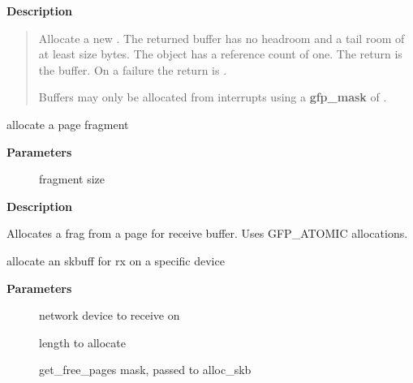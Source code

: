 \documentclass[a4paper,8pt,english]{sphinxmanual}
\begin{document}
\textbf{Description}
\begin{quote}

Allocate a new {\hyperref[networking/kapi:c.sk_buff]{\emph{}}}. The returned buffer has no headroom and a
tail room of at least size bytes. The object has a reference count
of one. The return is the buffer. On a failure the return is .

Buffers may only be allocated from interrupts using a \textbf{gfp\_mask} of
.
\end{quote}

\begin{fulllineitems}
\label{networking/kapi:c.netdev_alloc_frag}
allocate a page fragment

\end{fulllineitems}


\textbf{Parameters}
\begin{description}
\item[{}] \leavevmode
fragment size

\end{description}

\textbf{Description}

Allocates a frag from a page for receive buffer.
Uses GFP\_ATOMIC allocations.

\begin{fulllineitems}
\label{networking/kapi:c.__netdev_alloc_skb}
allocate an skbuff for rx on a specific device

\end{fulllineitems}


\textbf{Parameters}
\begin{description}
\item[{}] \leavevmode
network device to receive on

\item[{}] \leavevmode
length to allocate

\item[{}] \leavevmode
get\_free\_pages mask, passed to alloc\_skb

\end{description}
\end{document}
